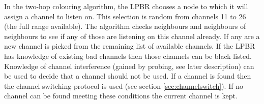In the two-hop colouring algorithm, the LPBR chooses a node to which it will assign a channel to listen on.  
This selection is random from channels 11 to 26 (the full range available).  The algorithm checks neighbours and neighbours of neighbours to see if any of those are listening on this channel already.  If any are a new channel is picked from the remaining list of available channels.  If the LPBR has knowledge of existing bad channels then those channels can be black listed.  Knowledge of channel interference (gained by probing, see later description) can be used to decide that a channel should not be used.  If a channel is found then the channel switching protocol is used (see section \ref{sec:channelswitch}).  If no channel can be found meeting these conditions the current
channel is kept.  

